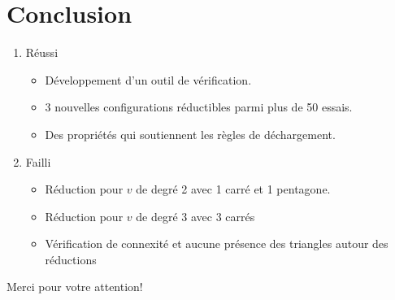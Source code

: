 \documentclass{beamer}
\begin{document}
\section{Conclusion}
\begin{frame}
\begin{enumerate}
\item Réussi
\begin{itemize}
\item Développement d'un outil de vérification.
\item 3 nouvelles configurations réductibles parmi plus de 50 essais.
\item Des propriétés qui soutiennent les règles de déchargement.
\end{itemize}
\item Failli
\begin{itemize}
\item Réduction pour $v$ de degré 2 avec 1 carré et 1 pentagone.
\item Réduction pour $v$ de degré 3 avec 3 carrés
\item Vérification de connexité et aucune présence des triangles autour des réductions
\end{itemize}
\end{enumerate}

\end{frame}

\begin{frame}
\begin{center}
Merci pour votre attention!
\end{center}
\end{frame}
\end{document}
